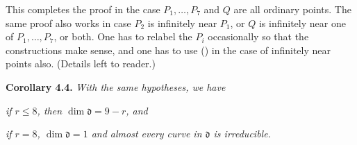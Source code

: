 {This completes the proof in the case $P_1,\ldots,P_7$ and $Q$ are all ordinary points. The same proof also works in case $P_2$ is infinitely near $P_1$, or $Q$ is infinitely near one of $P_1,\ldots,P_7$, or both. One has to relabel the $P_i$ occasionally so that the constructions make sense, and one has to use () in the case of infinitely near points also. (Details left to reader.)

\medskip
\noindent\hypertarget{result-V-4.4}{}\textbf{Corollary 4.4.} \emph{With the same hypotheses, we have}
\begin{parts}
\item\hypertarget{result-V-4.4a}{} \emph{if $r\le8$, then $\dim\mathfrak d=9-r$, and}
\item\hypertarget{result-V-4.4b}{} \emph{if $r=8$, $\dim\mathfrak d=1$ and almost every curve in $\mathfrak d$ is irreducible.}
\end{parts}
}
